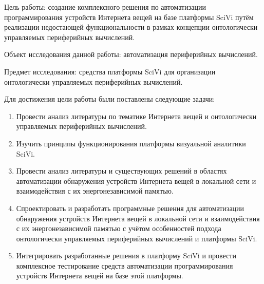 Цель работы: создание комплексного решения по автоматизации программирования устройств Интернета вещей на базе платформы SciVi путём реализации недостающей функциональности в рамках концепции онтологически управляемых периферийных вычислений.

Объект исследования данной работы: автоматизация периферийных вычислений.

Предмет исследования: средства платформы SciVi для организации онтологически управляемых периферийных вычислений.

Для достижения цели работы были поставлены следующие задачи:
\begin{enumerate}
	\item Провести анализ литературы по тематике Интернета вещей и онтологически управляемых периферийных вычислений.
	\item Изучить принципы функционирования платформы визуальной аналитики SciVi.
	\item Провести анализ литературы и существующих решений в областях автоматизации обнаружения устройств Интернета вещей в локальной сети и взаимодействия с их энергонезависимой памятью.
	\item Спроектировать и разработать программные решения для автоматизации обнаружения устройств Интернета вещей в локальной сети и взаимодействия с их энергонезависимой памятью с учётом особенностей подхода онтологически управляемых периферийных вычислений и платформы SciVi.
	\item Интегрировать разработанные решения в платформу SciVi и провести комплексное тестирование средств автоматизации программирования устройств Интернета вещей на базе этой платформы.
\end{enumerate}
